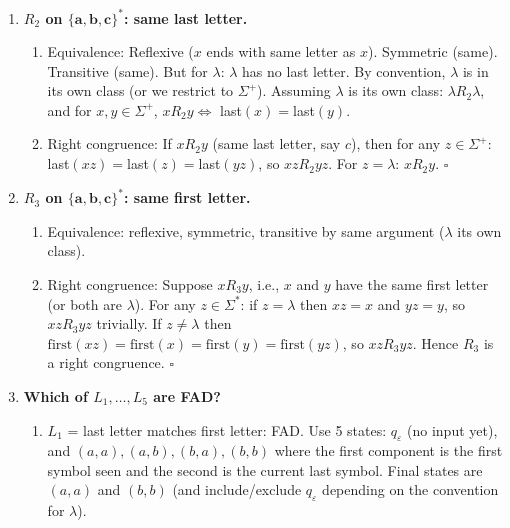 \begin{enumerate}[{2.}1.]
Case $x,y\in[\mathbf{a}]$: $x=y=\mathbf{a}$, $xa=ya=\mathbf{aa}\in[\mathbf{aa}]$.

Case $x,y\in[\mathbf{aa}]$: $|x|,|y|\geq 2$, so $|xa|,|ya|\geq 3\geq 2$, thus $xa,ya\in[\mathbf{aa}]$.

In each case $xa Q ya$. $\square$

\item \textbf{$R_2$ on $\{\mathbf{a},\mathbf{b},\mathbf{c}\}^*$: same last letter.}

\begin{enumerate}
\item Equivalence: Reflexive ($x$ ends with same letter as $x$). Symmetric (same). Transitive (same). But for $\lambda$: $\lambda$ has no last letter. By convention, $\lambda$ is in its own class (or we restrict to $\Sigma^+$). Assuming $\lambda$ is its own class: $\lambda R_2 \lambda$, and for $x,y\in\Sigma^+$, $x R_2 y\Leftrightarrow$ last$(x)=$last$(y)$.

\item Right congruence: If $x R_2 y$ (same last letter, say $c$), then for any $z\in\Sigma^+$: last$(xz)=$last$(z)=$last$(yz)$, so $xz R_2 yz$. For $z=\lambda$: $x R_2 y$. $\square$
\end{enumerate}

\item \textbf{$R_3$ on $\{\mathbf{a},\mathbf{b},\mathbf{c}\}^*$: same first letter.}

\begin{enumerate}
\item Equivalence: reflexive, symmetric, transitive by same argument ($\lambda$ its own class).

\item Right congruence: Suppose $x R_3 y$, i.e., $x$ and $y$ have the same first letter (or both are $\lambda$). For any $z\in\Sigma^*$: if $z=\lambda$ then $xz=x$ and $yz=y$, so $xz R_3 yz$ trivially. If $z\neq\lambda$ then $\text{first}(xz)=\text{first}(x)=\text{first}(y)=\text{first}(yz)$, so $xz R_3 yz$. Hence $R_3$ is a right congruence. $\square$
\end{enumerate}

\item \textbf{Which of $L_1,\ldots,L_5$ are FAD?}

\begin{enumerate}
\item $L_1$ = last letter matches first letter: FAD. Use 5 states:
$q_\varepsilon$ (no input yet), and $(a,a),(a,b),(b,a),(b,b)$ where the first component is the first symbol seen and the second is the current last symbol. Final states are $(a,a)$ and $(b,b)$ (and include/exclude $q_\varepsilon$ depending on the convention for $\lambda$).


\end{enumerate}
\end{enumerate}
